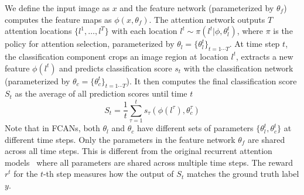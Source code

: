 \documentclass[10pt,twocolumn,letterpaper]{article}
\begin{document}
We define the input image as $x$ and the feature network (parameterized by $\theta_f$) computes the feature maps as $\phi(x, \theta_f)$.
The attention network outputs $T$ attention locations $\{l^1, \ldots, l^T\}$ with each location $l^t \sim \pi(l^t | \phi, \theta^t_l)$, where $\pi$ is the policy for attention selection, parameterized by $\theta_l=\{\theta^t_l\}_{t=1\cdots T}$.
At time step $t$, the classification component crops an image region at location $l^t$, extracts a new feature $\phi(l^t)$ and predicts classification score $s_t$ with the classification network (parameterized by $\theta_c=\{\theta^t_c\}_{t=1\cdots T}$).
It then computes the final classification score $S_t$ as the average of all prediction scores until time $t$
\begin{equation}
S_t = \frac{1}{t} \sum_{\tau=1}^t s_{\tau}(\phi(l^{\tau}), \theta^{\tau}_c)
\end{equation}
Note that in FCANs, both $\theta_l$ and $\theta_c$ have different sets of parameters $\{\theta^t_l, \theta^t_c\}$ at different time steps.
Only the parameters in the feature network $\theta_f$ are shared across all time steps.
This is different from the original recurrent attention models~\cite{mnih2014recurrent, ba2014multiple} where all parameters are shared across multiple time steps.
The reward $r^t$ for the $t$-th step measures how the output of $S_t$ matches the ground truth label $y$.




\end{document}
